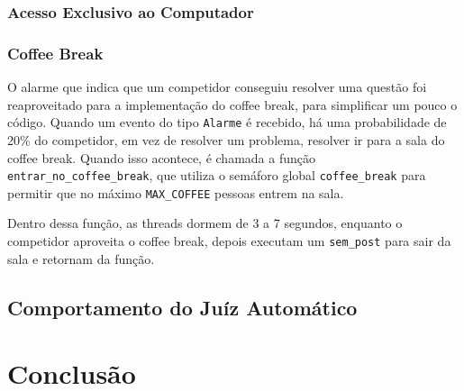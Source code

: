 \documentclass[11pt]{article}
\newcommand{\code}{\lstinline[mathescape=true]}
\begin{document}
	\subsubsection{Acesso Exclusivo ao Computador}
	
	\subsubsection{}

	\subsubsection{Coffee Break}
	O alarme que indica que um competidor conseguiu resolver uma questão foi reaproveitado para a
	implementação do coffee break, para simplificar um pouco o código. Quando um evento do tipo
	\code{Alarme} é recebido, há uma probabilidade de 20\% do competidor, em vez de resolver um problema,
	resolver ir para a sala do coffee break. Quando isso acontece, é chamada a função
	\code{entrar_no_coffee_break}, que utiliza o semáforo global \code{coffee_break} para permitir que no
	máximo \code{MAX_COFFEE} pessoas entrem na sala.

	Dentro dessa função, as threads dormem de 3 a 7 segundos, enquanto o competidor aproveita o coffee
	break, depois executam um \code{sem_post} para sair da sala e retornam da função.


\subsection{Comportamento do Juíz Automático}



\section{Conclusão}


\medskip
\printbibliography
\end{document}
